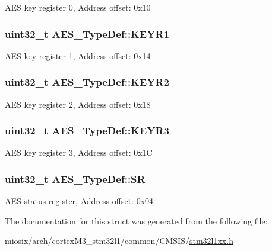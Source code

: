 A\-E\-S key register 0, Address offset\-: 0x10 \hypertarget{struct_a_e_s___type_def_a2755d099b5556ca661cad9c32eced4a4}{
\subsubsection[{K\-E\-Y\-R1}]{ uint32\-\_\-t A\-E\-S\-\_\-\-Type\-Def\-::\-K\-E\-Y\-R1}}\label{struct_a_e_s___type_def_a2755d099b5556ca661cad9c32eced4a4}
A\-E\-S key register 1, Address offset\-: 0x14 \hypertarget{struct_a_e_s___type_def_a415157c12229e50b4ae5e2dedfa37069}{
\subsubsection[{K\-E\-Y\-R2}]{ uint32\-\_\-t A\-E\-S\-\_\-\-Type\-Def\-::\-K\-E\-Y\-R2}}\label{struct_a_e_s___type_def_a415157c12229e50b4ae5e2dedfa37069}
A\-E\-S key register 2, Address offset\-: 0x18 \hypertarget{struct_a_e_s___type_def_ac4ed72833846f489d10cf751f552de7a}{
\subsubsection[{K\-E\-Y\-R3}]{ uint32\-\_\-t A\-E\-S\-\_\-\-Type\-Def\-::\-K\-E\-Y\-R3}}\label{struct_a_e_s___type_def_ac4ed72833846f489d10cf751f552de7a}
A\-E\-S key register 3, Address offset\-: 0x1\-C \hypertarget{struct_a_e_s___type_def_a567d574d42c57f0f5850eaada4eb1f31}{
\subsubsection[{S\-R}]{ uint32\-\_\-t A\-E\-S\-\_\-\-Type\-Def\-::\-S\-R}}\label{struct_a_e_s___type_def_a567d574d42c57f0f5850eaada4eb1f31}
A\-E\-S status register, Address offset\-: 0x04 

The documentation for this struct was generated from the following file\-:\begin{DoxyCompactItemize}
\item 
miosix/arch/cortex\-M3\-\_\-stm32l1/common/\-C\-M\-S\-I\-S/\hyperlink{stm32l1xx_8h}{stm32l1xx.\-h}\end{DoxyCompactItemize}

